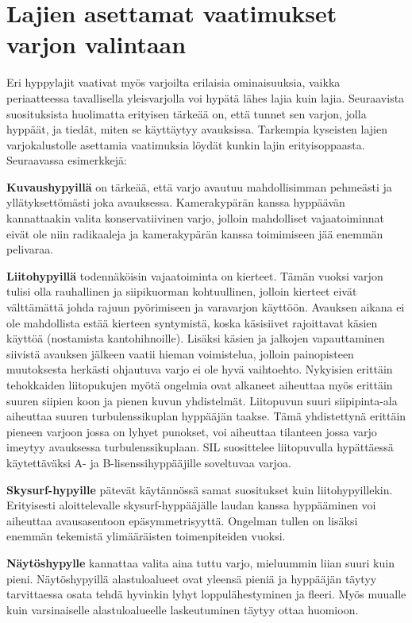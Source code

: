 \section{ Lajien asettamat vaatimukset varjon valintaan }
\label{varjon-valinta-lajien-asettamat-vaatimukset-varjon-valintaan}


Eri hyppylajit vaativat myös varjoilta erilaisia ominaisuuksia, vaikka periaatteessa tavallisella yleisvarjolla voi hypätä lähes lajia kuin lajia. Seuraavista suosituksista huolimatta erityisen tärkeää on, että tunnet sen varjon, jolla hyppäät, ja tiedät, miten se käyttäytyy avauksissa. Tarkempia kyseisten lajien varjokalustolle asettamia vaatimuksia löydät kunkin lajin erityisoppaasta. Seuraavassa esimerkkejä: 


\textbf{Kuvaushypyillä} on tärkeää, että varjo avautuu mahdollisimman pehmeästi ja yllätyksettömästi joka avauksessa. Kamerakypärän kanssa hyppäävän kannattaakin valita konservatiivinen varjo, jolloin mahdolliset vajaatoiminnat eivät ole niin radikaaleja ja kamerakypärän kanssa toimimiseen jää enemmän pelivaraa. 


\textbf{Liitohypyillä} todennäköisin vajaatoiminta on kierteet. Tämän vuoksi varjon tulisi olla rauhallinen ja siipikuorman kohtuullinen, jolloin kierteet eivät välttämättä johda rajuun pyörimiseen ja varavarjon käyttöön. Avauksen aikana ei ole mahdollista estää kierteen syntymistä, koska käsisiivet rajoittavat käsien käyttöä (nostamista kantohihnoille). Lisäksi käsien ja jalkojen vapauttaminen siivistä avauksen jälkeen vaatii hieman voimistelua, jolloin painopisteen muutoksesta herkästi ohjautuva varjo ei ole hyvä vaihtoehto. Nykyisien erittäin tehokkaiden liitopukujen myötä ongelmia ovat alkaneet aiheuttaa myös erittäin suuren siipien koon ja pienen kuvun yhdistelmät. Liitopuvun suuri siipipinta-ala aiheuttaa suuren turbulenssikuplan hyppääjän taakse. Tämä yhdistettynä erittäin pieneen varjoon jossa on lyhyet punokset, voi aiheuttaa tilanteen jossa varjo imeytyy avauksessa turbulenssikuplaan. SIL suosittelee liitopuvulla hypättäessä käytettäväksi A- ja B-lisenssihyppääjille soveltuvaa varjoa. 


\textbf{Skysurf-hypyille} pätevät käytännössä samat suositukset kuin liitohypyillekin. Erityisesti aloittelevalle skysurf-hyppääjälle laudan kanssa hyppääminen voi aiheuttaa avausasentoon epäsymmetrisyyttä. Ongelman tullen on lisäksi enemmän tekemistä ylimääräisten toimenpiteiden vuoksi. 


\textbf{Näytöshypylle} kannattaa valita aina tuttu varjo, mieluummin liian suuri kuin pieni. Näytöshypyillä alastuloalueet ovat yleensä pieniä ja hyppääjän täytyy tarvittaessa osata tehdä hyvinkin lyhyt loppulähestyminen ja fleeri. Myös muualle kuin varsinaiselle alastuloalueelle laskeutuminen täytyy ottaa huomioon. 


